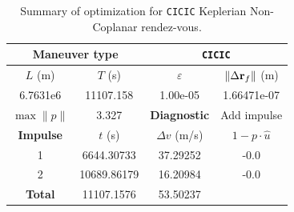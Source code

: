 \begin{table}[htpb]
    \centering
    \begin{tabular}{cccc} \toprule
    \multicolumn{2}{c}{\textbf{Maneuver type}} & \multicolumn{2}{c}{\texttt{CICIC}} \\ \midrule
    \(L\) (m) & \(T\) (s) & \(\varepsilon\) & \(\lVert \Delta \mathbf{r}_{f} \rVert\) (m)    \\ \midrule
    6.7631e6          & 11107.158          & 1.00e-05                & 1.66471e-07                        \\ \midrule
    \(\max \lVert p \rVert\) & 3.327     & \textbf{Diagnostic}   & Add impulse        \\ \midrule
    \textbf{Impulse} & \(t\) (s) & \(\Delta v\) (m/s) & \(1 - p \cdot \hat{u}\) \\ \midrule
    1                 & 6644.30733          & 37.29252             & -0.0                    \\
    2                 & 10689.86179          & 16.20984             & -0.0                    \\\midrule
    \textbf{Total}   & 11107.1576          & 53.50237             &                     \\ \bottomrule   
    \end{tabular}
    \caption{Summary of optimization for \texttt{CICIC} Keplerian Non-Coplanar rendez-vous.}
    \label{tab:tb_nr_CICIC_tab}
\end{table}

